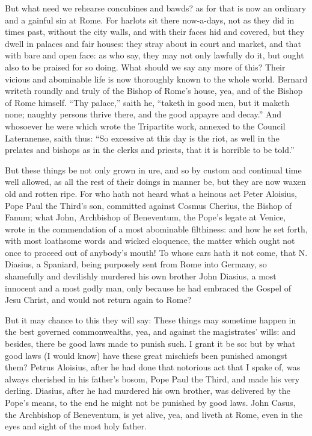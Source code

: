 But what need we rehearse concubines and bawds? as for that is now
an ordinary and a gainful sin at Rome. For harlots sit there now-a-days,
not as they did in times past, without the city walls, and with their
faces hid and covered, but they dwell in palaces and fair houses: they
stray about in court and market, and that with bare and open face: as
who say, they may not only lawfully do it, but ought also to be praised
for so doing. What should we say any more of this? Their
vicious and abominable life is now thoroughly known
to the whole world. Bernard writeth roundly and truly of the Bishop
of Rome’s house, yea, and of the Bishop of Rome himself.
“Thy palace,” saith he, “taketh in good men, but it
maketh none; naughty persons thrive there, and the good appayre and
decay.” And whosoever he were which wrote the Tripartite
work, annexed to the Council Lateranense, saith thus: “So excessive
at this day is the riot, as well in the prelates and bishops as in the
clerks and priests, that it is horrible to be told.”

But these things be not only grown in ure, and so by custom and continual
time well allowed, as all the rest of their doings in manner be, but
they are now waxen old and rotten ripe. For who hath not heard
what a heinous act Peter Aloisius, Pope Paul the Third’s son,
committed against Cosmus Cherius, the Bishop of Fanum; what John, Archbishop
of Beneventum, the Pope’s legate at Venice, wrote in the commendation
of a most abominable filthiness: and how he set forth, with most loathsome
words and wicked eloquence, the matter which ought not once to proceed
out of anybody’s mouth! To whose ears hath it not come,
that N. Diasius, a Spaniard, being purposely sent from Rome into Germany,
so shamefully and devilishly murdered his own brother John
Diasius, a most innocent and a most godly man, only because he had embraced
the Gospel of Jesu Christ, and would not return again to Rome?

But it may chance to this they will say: These things may sometime
happen in the best governed commonwealths, yea, and against the magistrates’
wills: and besides, there be good laws made to punish such. I
grant it be so: but by what good laws (I would know) have these great
mischiefs been punished amongst them? Petrus Aloisius, after he
had done that notorious act that I spake of, was always cherished in
his father’s bosom, Pope Paul the Third, and made his very derling.
Diasius, after he had murdered his own brother, was delivered by the
Pope’s means, to the end he might not be punished by good laws.
John Casus, the Archbishop of Beneventum, is yet alive, yea, and liveth
at Rome, even in the eyes and sight of the most holy father.


